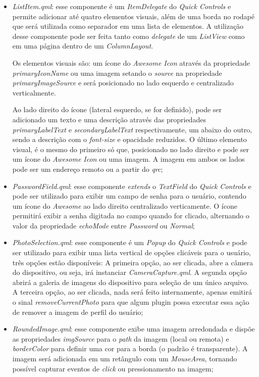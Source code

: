 \begin{itemize}
	\item \textit{ListItem.qml}: esse componente é um \textit{ItemDelegate} do \textit{Quick Controls} e permite adicionar até quatro elementos visuais, além de uma borda no rodapé que será utilizada como separador em uma lista de elementos. A utilização desse componente pode ser feita tanto como \textit{delegate} de um \textit{ListView} como em uma página dentro de um \textit{ColumnLayout}.\par
	Os elementos visuais são: um ícone do \textit{Awesome Icon} através da propriedade \textit{primaryIconName} ou uma imagem setando o \textit{source} na propriedade \textit{primaryImageSource} e será posicionado no lado esquerdo e centralizado verticalmente.\par
	Ao lado direito do ícone (lateral esquerdo, se for definido), pode ser adicionado um texto e uma descrição através das propriedades \textit{primaryLabelText} e \textit{secondaryLabelText} respectivamente, um abaixo do outro, sendo a descrição com o \textit{font-size} e opacidade reduzidos. O último elemento visual, é o mesmo do primeiro só que, posicionado no lado direito e pode ser um ícone do \textit{Awesome Icon} ou uma imagem. A imagem em ambos os lados pode ser um endereço remoto ou a partir do \textit{qrc};

	\item \textit{PasswordField.qml}: esse componente \textit{extends} o \textit{TextField} do \textit{Quick Controls} e pode ser utilizado para exibir um campo de senha para o usuário, contendo um ícone do \textit{Awesome} ao lado direito centralizado verticamente. O ícone permitirá exibir a senha digitada no campo quando for clicado, alternando o valor da propriedade \textit{echoMode} entre \textit{Password} ou \textit{Normal};

	\item \textit{PhotoSelection.qml}: esse componente é um \textit{Popup} do \textit{Quick Controls} e pode ser utilizado para exibir uma lista vertical de opções clicáveis para o usuário, três opções estão disponíveis: A primeira opção, ao ser clicada, abre a câmera do dispositivo, ou seja, irá instanciar \textit{CameraCapture.qml}. A segunda opção abrirá a galeria de imagens do dispositivo para seleção de um único arquivo. A terceira opção, ao ser clicada, nada será feito internamente, apenas emitirá o sinal \textit{removeCurrentPhoto} para que algum plugin possa executar essa ação de remover a imagem de perfil do usuário;

	\item \textit{RoundedImage.qml}: esse componente exibe uma imagem arredondada e dispõe as propriedades \textit{imgSource} para o \textit{path} da imagem (local ou remota) e \textit{borderColor} para definir uma cor para a borda (o padrão é transparente). A imagem será adicionada em um retângulo com um \textit{MouseArea}, tornando possível capturar eventos de \textit{click} ou pressionamento na imagem;


\end{itemize}
